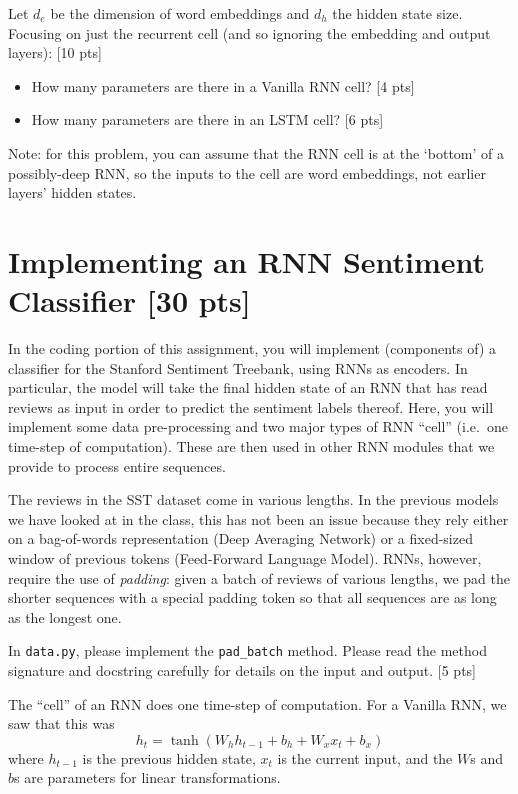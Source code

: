 \documentclass[11pt]{article}
\begin{document}
\vspace{2em}
  Let $d_e$ be the dimension of word embeddings and $d_h$ the hidden state size.  Focusing on just the recurrent cell (and so ignoring the embedding and output layers): \hfill [10 pts]
\begin{itemize}
  \item How many parameters are there in a Vanilla RNN cell? \hfill [4 pts]
  \item How many parameters are there in an LSTM cell? \hfill [6 pts]
\end{itemize}
Note: for this problem, you can assume that the RNN cell is at the `bottom' of a possibly-deep RNN, so the inputs to the cell are word embeddings, not earlier layers' hidden states.


\section{Implementing an RNN Sentiment Classifier [30 pts]}

In the coding portion of this assignment, you will implement (components of) a classifier for the Stanford Sentiment Treebank, using RNNs as encoders.  In particular, the model will take the final hidden state of an RNN that has read reviews as input in order to predict the sentiment labels thereof.  Here, you will implement some data pre-processing and two major types of RNN ``cell'' (i.e.\ one time-step of computation).  These are then used in other RNN modules that we provide to process entire sequences.

\vspace{2em}
 The reviews in the SST dataset come in various lengths.  In the previous models we have looked at in the class, this has not been an issue because they rely either on a bag-of-words representation (Deep Averaging Network) or a fixed-sized window of previous tokens (Feed-Forward Language Model).  RNNs, however, require the use of \emph{padding}: given a batch of reviews of various lengths, we pad the shorter sequences with a special padding token so that all sequences are as long as the longest one.

\noindent In \texttt{data.py}, please implement the \texttt{pad\_batch} method.  Please read the method signature and docstring carefully for details on the input and output. \hfill [5 pts]


\vspace{2em}
 The ``cell'' of an RNN does one time-step of computation.  For a Vanilla RNN, we saw that this was
\[ h_t = \tanh\left( W_h h_{t-1} + b_h + W_x x_t + b_x \right) \]
where $h_{t-1}$ is the previous hidden state, $x_t$ is the current input, and the $W$s and $b$s are parameters for linear transformations.
\end{document}
